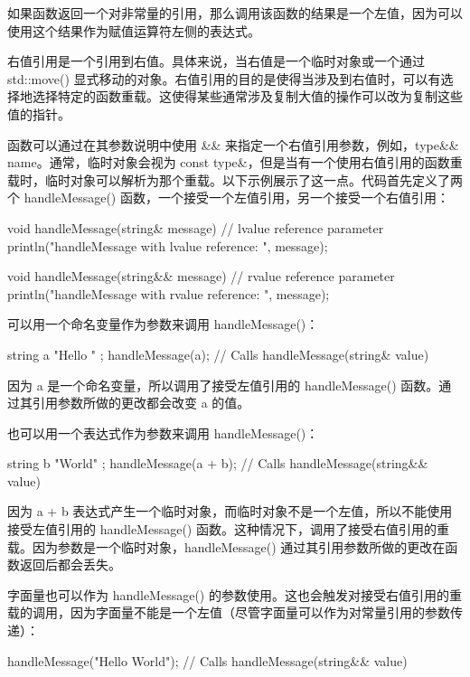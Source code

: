 如果函数返回一个对非常量的引用，那么调用该函数的结果是一个左值，因为可以使用这个结果作为赋值运算符左侧的表达式。

右值引用是一个引用到右值。具体来说，当右值是一个临时对象或一个通过 std::move() 显式移动的对象。右值引用的目的是使得当涉及到右值时，可以有选择地选择特定的函数重载。这使得某些通常涉及复制大值的操作可以改为复制这些值的指针。

函数可以通过在其参数说明中使用 \&\& 来指定一个右值引用参数，例如，type\&\& name。通常，临时对象会视为 const type\&，但是当有一个使用右值引用的函数重载时，临时对象可以解析为那个重载。以下示例展示了这一点。代码首先定义了两个 handleMessage() 函数，一个接受一个左值引用，另一个接受一个右值引用：

\begin{cpp}
void handleMessage(string& message) // lvalue reference parameter
{
    println("handleMessage with lvalue reference: {}", message);
}

void handleMessage(string&& message) // rvalue reference parameter
{
    println("handleMessage with rvalue reference: {}", message);
}
\end{cpp}

可以用一个命名变量作为参数来调用 handleMessage()：

\begin{cpp}
string a { "Hello " };
handleMessage(a); // Calls handleMessage(string& value)
\end{cpp}

因为 a 是一个命名变量，所以调用了接受左值引用的 handleMessage() 函数。通过其引用参数所做的更改都会改变 a 的值。

也可以用一个表达式作为参数来调用 handleMessage()：

\begin{cpp}
string b { "World" };
handleMessage(a + b); // Calls handleMessage(string&& value)
\end{cpp}

因为 a + b 表达式产生一个临时对象，而临时对象不是一个左值，所以不能使用接受左值引用的 handleMessage() 函数。这种情况下，调用了接受右值引用的重载。因为参数是一个临时对象，handleMessage() 通过其引用参数所做的更改在函数返回后都会丢失。

字面量也可以作为 handleMessage() 的参数使用。这也会触发对接受右值引用的重载的调用，因为字面量不能是一个左值（尽管字面量可以作为对常量引用的参数传递）：

\begin{cpp}
handleMessage("Hello World"); // Calls handleMessage(string&& value)
\end{cpp}

